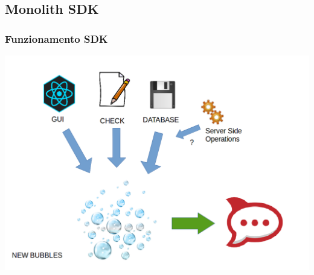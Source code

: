 \subsection{Monolith SDK}

\begin{frame}
	\frametitle{Funzionamento SDK}
\begin{center}
	\includegraphics[width=\linewidth,height=.8\textheight,keepaspectratio]{img/uso_sdk.png}
\end{center}
\end{frame}
